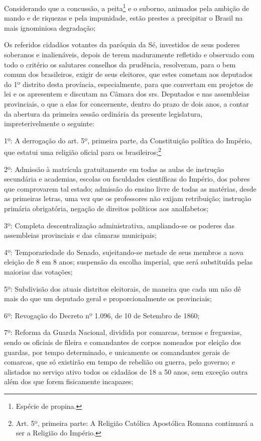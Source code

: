 Considerando que a concussão, a peita\footnote{Espécie de propina.} e
o suborno, animados pela ambição de mando e de riquezas e pela
impunidade, estão prestes a precipitar o Brasil na mais ignominiosa
degradação;

Os referidos cidadãos votantes da paróquia da Sé, investidos de seus
poderes soberanos e inalienáveis, depois de terem maduramente refletido
e observado com todo o critério os salutares conselhos da prudência,
resolveram, para o bem comum dos brasileiros, exigir de seus eleitores,
que estes cometam aos deputados do 1º distrito desta província,
especialmente, para que convertam em projetos de lei e os apresentem e
discutam na Câmara dos srs. Deputados e nas assembleias provinciais, o
que a elas for concernente, dentro do prazo de dois anos, a contar da
abertura da primeira sessão ordinária da presente legislatura,
impreterivelmente o seguinte:

1º: A derrogação do art. 5º, primeira parte, da Constituição política do
Império, que estatui uma religião oficial para os
brasileiros;\footnote{Art. 5º, primeira parte: A Religião Católica
  Apostólica Romana continuará a ser a Religião do Império.}

2º: Admissão à matrícula gratuitamente em todas as aulas de instrução
secundária e academias, escolas ou faculdades científicas do Império,
dos pobres que comprovarem tal estado; admissão do ensino livre de todas
as matérias, desde as primeiras letras, uma vez que os professores não
exijam retribuição; instrução primária obrigatória, negação de direitos
políticos aos analfabetos;

3º: Completa descentralização administrativa, ampliando-se os poderes
das assembleias provinciais e das câmaras municipais;

4º: Temporariedade do Senado, sujeitando-se metade de seus membros a
nova eleição de 8 em 8 anos; suspensão da escolha imperial, que será
substituída pelas maiorias das votações;

5º: Subdivisão dos atuais distritos eleitorais, de maneira que cada um
não dê mais do que um deputado geral e proporcionalmente os provinciais;

6º: Revogação do Decreto nº 1.096, de 10 de Setembro de 1860;

7º: Reforma da Guarda Nacional, dividida por comarcas, termos e
freguesias, sendo os oficiais de fileira e comandantes de corpos
nomeados por eleição dos guardas, por tempo determinado, e unicamente os
comandantes gerais de comarcas, que só existirão em tempo de rebelião ou
guerra, pelo governo; e alistados no serviço ativo todos os cidadãos de
18 a 50 anos, sem exceção outra além dos que forem fisicamente
incapazes;


